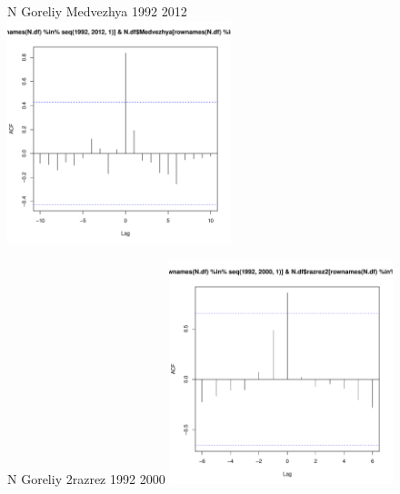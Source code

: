 \documentclass[12pt, a4paper]{disser}
\begin{document}
	\begin{figure}[ht]
	
	\begin{minipage}[b]{.46\linewidth}
	\begin{center}
	{\tiny N Goreliy Medvezhya 1992 2012}
		\includegraphics[width=65mm]{../White_Sea/dynamic_N_N1/crosscorr_N_Goreliy_Medvezhya_1992_2012.pdf}

	\end{center}
	\end{minipage}
	\hfil %
	\begin{minipage}[b]{.46\linewidth}
	\begin{center}
	{\tiny N Goreliy 2razrez 1992 2000}
		\includegraphics[width=65mm]{../White_Sea/dynamic_N_N1/crosscorr_N_Goreliy_2razrez_1992_2000.pdf}
	\end{center}
	\end{minipage}




\end{figure}
\end{document}
